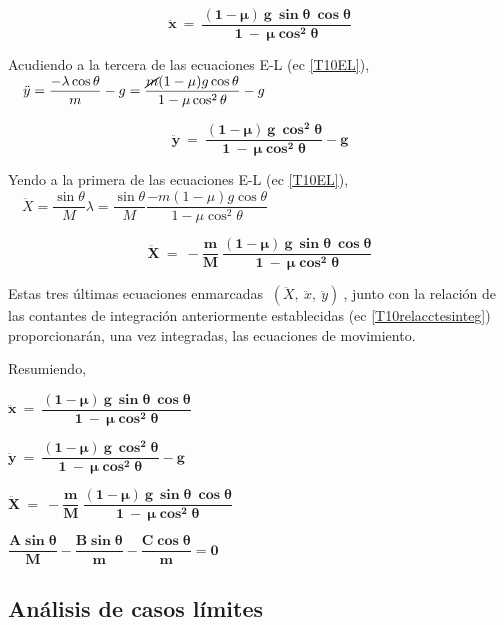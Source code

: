 \begin{equation}
\label{T10ecx} 
\boxed{ \ \boldsymbol{ \ddot x \ = \ \dfrac{(1-\mu) \ g \ \sin \theta \ \cos \theta}{1 \ - \ \mu \cos^2 \theta} } \ }	
\end{equation}

Acudiendo a la tercera de las ecuaciones E-L (ec \ref{T10EL}),
$\quad \ddot y = \dfrac{-\lambda \cos \theta}{m}-g=\dfrac{\cancel{m} (1-\mu) g \cos \theta}{1-\mu \cos^2 \theta}-g$

\begin{equation}
\label{T10ecx} 
\boxed{ \ \boldsymbol{ \ddot y \ = \ \dfrac{(1-\mu) \ g  \ \cos^2 \theta}{1 \ - \ \mu \cos^2 \theta} - g  } \ }	
\end{equation}

Yendo a la primera de las ecuaciones E-L (ec \ref{T10EL}), $\quad \ddot X=\dfrac{\sin \theta}{M} \lambda=\dfrac{\sin \theta}{M}  \dfrac{-m(1-\mu) g \cos \theta}{1-\mu \cos^2 \theta}$

\begin{equation}
\label{T10ecx} 
\boxed{ \ \boldsymbol{ \ddot X \ = \ - \dfrac m M \ \dfrac{(1-\mu) \ g \ \sin \theta \ \cos \theta}{1 \ - \ \mu \cos^2 \theta} } \ }	
\end{equation}

Estas tres últimas ecuaciones enmarcadas $  \  ( \ddot X,\ \ddot x,\ \ddot y  ) \ $, junto con la relación de las contantes de integración anteriormente establecidas (ec \ref{T10relacctesinteg}) proporcionarán, una vez integradas, las ecuaciones de movimiento.


Resumiendo,

\begin{adjustwidth}{100pt}{10pt}
	
$\boldsymbol{ \ddot x \ = \ \dfrac{(1-\mu) \ g \ \sin \theta \ \cos \theta}{1 \ - \ \mu \cos^2 \theta} }$

$\boldsymbol{ \ddot y \ = \ \dfrac{(1-\mu) \ g  \ \cos^2 \theta}{1 \ - \ \mu \cos^2 \theta} - g }$


$\boldsymbol{ \ddot X \ = \ - \dfrac m M \ \dfrac{(1-\mu) \ g \ \sin \theta \ \cos \theta}{1 \ - \ \mu \cos^2 \theta} }$


$\boldsymbol{ \dfrac{A \sin \theta}{M} - \dfrac{B \sin \theta}{m} - \dfrac{C \cos \theta}{m}=0 }$

\end{adjustwidth}

\subsection{Análisis de casos límites}
\vspace{0.5cm}

